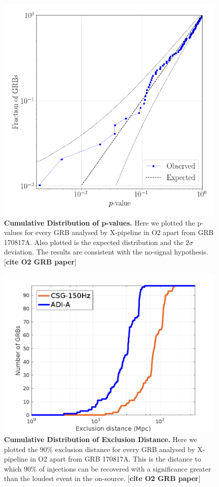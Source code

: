 \documentclass[11pt]{cuthesis}
\newcommand{\xp}{X-pipeline }
\begin{document}
\begin{figure} %
\begin{center}
\includegraphics[width=0.8\linewidth]{xpvalue.png}
\end{center}
\caption{\textbf{Cumulative Distribution of p-values.} Here we plotted the p-values for every GRB analysed by \xp in O2 apart from GRB 170817A. Also plotted is the expected distribution and the $2\sigma$ deviation. The results are consistent with the no-signal hypothesis. [\textbf{cite O2 GRB paper}]} 
\label{fig:xpvalue}
\end{figure}

\begin{figure} %
\begin{center}
\includegraphics[width=0.8\linewidth]{burst_exclusion_distance.png}
\end{center}
\caption{\textbf{Cumulative Distribution of Exclusion Distance.} Here we plotted the 90\% exclusion distance for every GRB analysed by \xp in O2 apart from GRB 170817A. This is the distance to which 90\% of injections can be recovered with a significance greater than the loudest event in the on-source. [\textbf{cite O2 GRB paper}] } 
\label{fig:x ex dist}
\end{figure}
\end{document}
